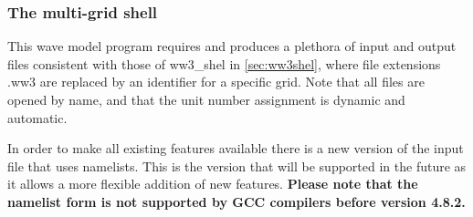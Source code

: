\vsssub
\subsubsection{The multi-grid shell} \label{sec:ww3multi}
\vsssub


\vspace{\baselineskip}
\noindent
This wave model program requires and produces a plethora of input and output
files consistent with those of {\file ww3\_shel} in \para\ref{sec:ww3shel},
where file extensions {\file .ww3} are replaced by an identifier for a
specific grid. Note that all files are opened by name, and that the unit
number assignment is dynamic and automatic.

In order to make all existing features available there is a new version of the input file that uses namelists. This 
is the version that will be supported in the future as it allows a more flexible addition of new features. 
{\bf Please note that the namelist form is not supported by GCC compilers before version 4.8.2.} 


\pb


\pb
